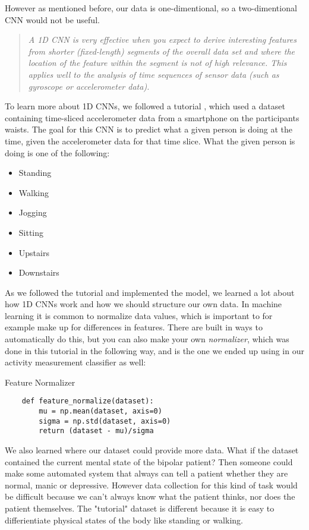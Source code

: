 However as mentioned before, our data is one-dimentional, so a two-dimentional CNN would not be useful.

\begin{quote}
  \textit{A 1D CNN is very effective when you expect to derive interesting features from shorter (fixed-length) segments of the overall data set 
  and where the location of the feature within the segment is not of high relevance. This applies well to the analysis of time sequences of sensor data 
  (such as gyroscope or accelerometer data).} \cite{1d_cnn}
\end{quote}

To learn more about 1D CNNs, we followed a tutorial \cite{1d_cnn}, which used a dataset containing 
time-sliced accelerometer data from a smartphone on the participants waists. The goal for this CNN is to predict what a given person is doing 
at the time, given the accelerometer data for that time slice. What the given person is doing is one of the following:
\begin{itemize}
  \item Standing
  \item Walking
  \item Jogging
  \item Sitting
  \item Upstairs
  \item Downstairs
\end{itemize}

As we followed the tutorial and implemented the model, we learned a lot about how 1D CNNs work and how we should structure our own data. 
In machine learning it is common to normalize data values, which is important to for example make up for differences in features. 
There are built in ways to automatically do this, but you can also make your own \textit{normalizer}, which was done in this tutorial in the following way, 
and is the one we ended up using in our activity measurement classifier as well:

\begin{code}
  \caption{Feature Normalizer}
  \label{code:feature_normalizer}
  
  \begin{verbatim}
    def feature_normalize(dataset):
        mu = np.mean(dataset, axis=0)
        sigma = np.std(dataset, axis=0)
        return (dataset - mu)/sigma
  \end{verbatim}
\end{code}

We also learned where our dataset could provide more data. 
What if the dataset contained the current mental state of the bipolar patient? Then someone could make some automated system that always can tell a patient 
whether they are normal, manic or depressive. However data collection for this kind of task would be difficult because we can't always know what the
patient thinks, nor does the patient themselves. The "tutorial" dataset is different because it is easy to differientiate physical states of the body
like standing or walking.

